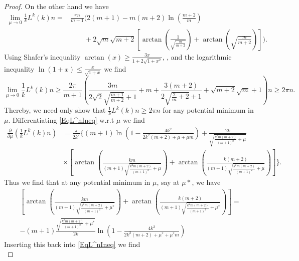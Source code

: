 \documentclass[a4paper,11pt]{article}
\numberwithin{equation}{section}
\begin{document}
\begin{proof}
		On the other hand we have \begin{equation}
		\begin{aligned}
		\lim\limits_{\mu\to0}\frac{1}{k}L^k(k)n=&\frac{\pi n}{m+1}  \Bigg(2 (m+1)-m (m+2) \ln \left(\frac{m+2}{m}\right)\\
		&\qquad+2 \sqrt{m} \sqrt{m+2} \left[\arctan\left(\frac{1}{\sqrt{\frac{m}{m+2}}}\right)+\arctan\left(\sqrt{\frac{m}{m+2}}\right)\right]\Bigg).
		\end{aligned}
		\end{equation}
		Using Shafer's inequality $ \arctan(x)\geq \frac{3x}{1+2\sqrt{1+x^2}} $, \cite{Qi_2009}, and the logarithmic inequality $ \ln(1+x)\leq\frac{x}{\sqrt{1+x}} $ we find \begin{equation}
		\lim\limits_{\mu\to0}\frac{1}{k}L^k(k)n\geq\frac{2 \pi}{m+1}  \left(\frac{3 m}{2 \sqrt{2} \sqrt{\frac{m+1}{m+2}}+1}+m+\frac{3 (m+2)}{2 \sqrt{\frac{2}{m}+2}+1}+\sqrt{m+2} \sqrt{m}+1\right)n\geq2\pi n.
		\end{equation}
		Thereby, we need only show that $ \frac{1}{k}L^k(k)n\geq2\pi n $ for any potential minimum in $ \mu $.
		Differentiating \eqref{EqL^nIneq} w.r.t $ \mu $ we find \begin{equation}
		\begin{aligned}
		\frac{\partial}{\partial\mu}\left(\frac{1}{k}L^k(k)n\right)&=\frac{\pi}{2 k^2}  \Bigg\{(m+1) \ln \left(1-\frac{4 k^2}{2 k^2 (m+2)+\mu +\mu  m}\right)+\frac{2 k}{\sqrt{\frac{k^2 m (m+2)}{(m+1)^2}+\mu }}\\&\times \left[\arctan\left(\frac{k m}{(m+1) \sqrt{\frac{k^2 m (m+2)}{(m+1)^2}+\mu }}\right)+\arctan\left(\frac{k
					(m+2)}{(m+1) \sqrt{\frac{k^2 m (m+2)}{(m+1)^2}+\mu }}\right)\right]\Bigg\}.
		\end{aligned}
		\end{equation}
		Thus we find that at any potential minimum in $ \mu $, say at $ \mu* $, we have\begin{equation}
		\begin{aligned}
		\left[\arctan\left(\frac{k m}{(m+1) \sqrt{\frac{k^2 m (m+2)}{(m+1)^2}+\mu^* }}\right)+\arctan\left(\frac{k
			(m+2)}{(m+1) \sqrt{\frac{k^2 m (m+2)}{(m+1)^2}+\mu^* }}\right)\right]=\\
		-(m+1)\frac{\sqrt{\frac{k^2 m (m+2)}{(m+1)^2}+\mu^* }}{2 k} \ln \left(1-\frac{4 k^2}{2 k^2 (m+2)+\mu^* +\mu^*  m}\right)
		\end{aligned}
		\end{equation}
		Inserting this back into \eqref{EqL^nIneq} we find 
		 \begin{equation}

\end{equation}
\end{proof}
\end{document}
